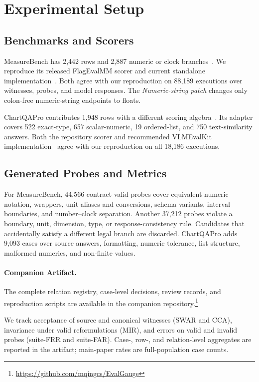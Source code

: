 \documentclass[a4paper]{llncs}
\begin{document}
\section{Experimental Setup}
\subsection{Benchmarks and Scorers}
MeasureBench has 2,442 rows and 2,887 numeric or clock branches~\cite{lin2026measurebench}. We reproduce its released FlagEvalMM scorer and current standalone implementation~\cite{measurebenchrepo2026}. Both agree with our reproduction on 88,189 executions over witnesses, probes, and model responses. The \emph{Numeric-string patch} changes only colon-free numeric-string endpoints to floats.

ChartQAPro contributes 1,948 rows with a different scoring algebra~\cite{masry2025chartqapro}. Its adapter covers 522 exact-type, 657 scalar-numeric, 19 ordered-list, and 750 text-similarity answers. Both the repository scorer and recommended VLMEvalKit implementation~\cite{duan2024vlmevalkit} agree with our reproduction on all 18,186 executions.

\subsection{Generated Probes and Metrics}
For MeasureBench, 44,566 contract-valid probes cover equivalent numeric notation, wrappers, unit aliases and conversions, schema variants, interval boundaries, and num\-ber--clock separation. Another 37,212 probes violate a boundary, unit, dimension, type, or response-consistency rule. Candidates that accidentally satisfy a different legal branch are discarded. ChartQAPro adds 9,093 cases over source answers, formatting, numeric tolerance, list structure, malformed numerics, and non-finite values.

\paragraph{Companion Artifact.}
The complete relation registry, case-level decisions, review rec\-ords,
and reproduction scripts are available in the companion
repository.\footnote{\url{https://github.com/mqingcs/EvalGauge}}

We track acceptance of source and canonical witnesses (SWAR and CCA), invariance under valid reformulations (MIR), and errors on valid and invalid probes (suite-FRR and suite-FAR). Case-, row-, and relation-level aggregates are reported in the artifact; main-paper rates are full-population case counts.
\end{document}
